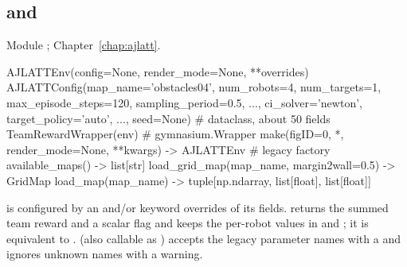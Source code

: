 \subsection{\texorpdfstring{ and }{AJLATTEnv and AJLATTConfig}}

Module ; Chapter~\ref{chap:ajlatt}.

\begin{pycode}
AJLATTEnv(config=None, render_mode=None, **overrides)
AJLATTConfig(map_name='obstacles04', num_robots=4, num_targets=1,
             max_episode_steps=120, sampling_period=0.5, ..., ci_solver='newton',
             target_policy='auto', ..., seed=None)   # dataclass, about 50 fields
TeamRewardWrapper(env)                # gymnasium.Wrapper
make(figID=0, *, render_mode=None, **kwargs) -> AJLATTEnv   # legacy factory
available_maps() -> list[str]
load_grid_map(map_name, margin2wall=0.5) -> GridMap
load_map(map_name) -> tuple[np.ndarray, list[float], list[float]]
\end{pycode}

 is configured by an  and/or keyword
overrides of its fields.  returns the summed team
reward and a scalar  flag and keeps the per-robot values in
 and ; it is
equivalent to .
 (also callable as ) accepts the
legacy parameter names with a  and ignores unknown
names with a warning.

